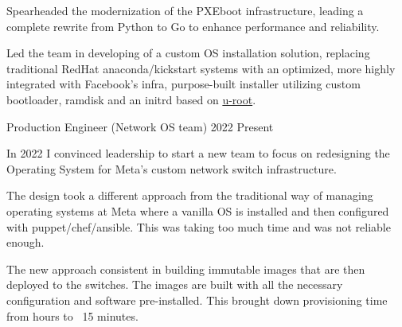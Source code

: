 \begin{cventries}
{\begin{cvitems}
      \item {Spearheaded the modernization of the PXEboot infrastructure, leading a complete rewrite from Python
                  to Go to enhance performance and reliability.}
      \item {Led the team in developing of a custom OS installation solution, replacing traditional RedHat
                  anaconda/kickstart systems with an optimized, more highly integrated with Facebook's infra, purpose-built installer utilizing custom bootloader, ramdisk and an initrd based on \href{https://github.com/u-root/u-root}{u-root}.}
    \end{cvitems}
  }

  \cventryprevrole
  {Production Engineer (Network OS team)}
  {2022 \newline Present}
  {
    In 2022 I convinced leadership to start a new team to focus on redesigning the Operating System for Meta's custom network switch infrastructure.
    \begin{cvitems}
      \item {The design took a different approach from the traditional way of managing operating systems at Meta where a vanilla OS is installed and then configured with puppet/chef/ansible. This was taking too much time and was not reliable enough.}
      \item{The new approach consistent in building immutable images that are then deployed to the switches. The images are built with all the necessary configuration and software pre-installed. This brought down provisioning time from hours to ~15 minutes.}
    \end{cvitems}
  }



\end{cventries}
